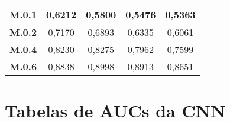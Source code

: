 \begin{apendicesenv}
\begin{table}[!ht]
\begin{tabular}{|c|c|c|c|c|}
\textbf{M.0.1}  & 0,6212      & 0,5800      & 0,5476      & 0,5363      \\ \hline
\textbf{M.0.2}  & 0,7170      & 0,6893      & 0,6335      & 0,6061      \\ \hline
\textbf{M.0.4}  & 0,8230      & 0,8275      & 0,7962      & 0,7599      \\ \hline
\textbf{M.0.6}  & 0,8838      & 0,8998      & 0,8913      & 0,8651      \\ \hline
\end{tabular}
\end{table}




\chapter{Tabelas de AUCs da CNN}
\label{chap:apendiceB}


\end{apendicesenv}
